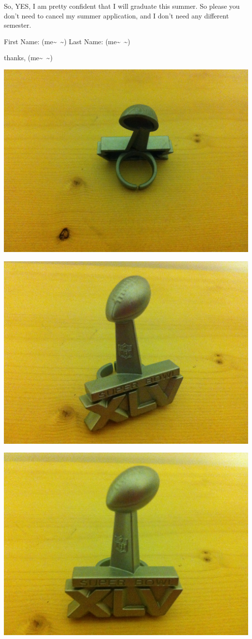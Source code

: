 \documentclass[9pt,b5paper]{article}
\begin{document}
So, YES, I am pretty confident that I will graduate this summer. So please you don't need to cancel my summer application, and I don't need any different semester. 

First Name: (me\textasciitilde{}~\textasciitilde{}) 
Last Name: (me\textasciitilde{}~\textasciitilde{}) 

thanks,
(me\textasciitilde{}~\textasciitilde{}) 

\includegraphics[width=.9\linewidth]{./ring/IMG_0370.JPG}

\includegraphics[width=.9\linewidth]{./ring/IMG_0371.JPG}

\includegraphics[width=.9\linewidth]{./ring/IMG_0372.JPG}
\end{document}
